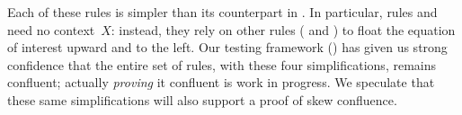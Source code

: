 \documentclass[acmsmall]{acmart}
\newcommand{\eg}{\emph{e.g.}\xspace}
\begin{document}
Each of these rules is simpler than its counterpart in . In particular, rules  and 
need no context~\ensuremath{X}: instead, they rely on other rules (
and ) to float the equation of interest upward and to the left.  Our testing framework ()
has given us strong confidence that the entire set of rules, with these four simplifications, remains confluent; actually \emph{proving} it confluent
is work in progress. We speculate that these same simplifications will also support a proof of skew confluence.

%
%


%
\end{document}
